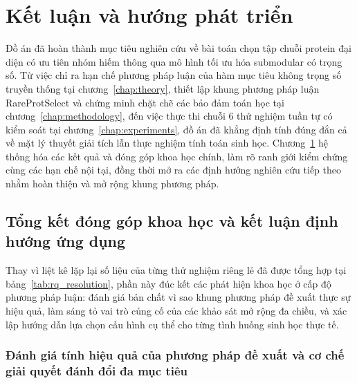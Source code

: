 \chapter{Kết luận và hướng phát triển}
\label{chap:conclusion}

Đồ án đã hoàn thành mục tiêu nghiên cứu về bài toán chọn tập chuỗi protein đại diện có ưu tiên nhóm hiếm thông qua mô hình tối ưu hóa submodular có trọng số. Từ việc chỉ ra hạn chế phương pháp luận của hàm mục tiêu không trọng số truyền thống tại chương~\ref{chap:theory}, thiết lập khung phương pháp luận RareProtSelect và chứng minh chặt chẽ các bảo đảm toán học tại chương~\ref{chap:methodology}, đến việc thực thi chuỗi 6 thử nghiệm tuần tự có kiểm soát tại chương~\ref{chap:experiments}, đồ án đã khẳng định tính đúng đắn cả về mặt lý thuyết giải tích lẫn thực nghiệm tính toán sinh học. Chương~\ref{chap:conclusion} hệ thống hóa các kết quả và đóng góp khoa học chính, làm rõ ranh giới kiểm chứng cùng các hạn chế nội tại, đồng thời mở ra các định hướng nghiên cứu tiếp theo nhằm hoàn thiện và mở rộng khung phương pháp.

\section{Tổng kết đóng góp khoa học và kết luận định hướng ứng dụng}
\label{sec:conc_contributions}

Thay vì liệt kê lặp lại số liệu của từng thử nghiệm riêng lẻ đã được tổng hợp tại bảng~\ref{tab:rq_resolution}, phần này đúc kết các phát hiện khoa học ở cấp độ phương pháp luận: đánh giá bản chất vì sao khung phương pháp đề xuất thực sự hiệu quả, làm sáng tỏ vai trò củng cố của các khảo sát mở rộng đa chiều, và xác lập hướng dẫn lựa chọn cấu hình cụ thể cho từng tình huống sinh học thực tế.

\subsection{Đánh giá tính hiệu quả của phương pháp đề xuất và cơ chế giải quyết đánh đổi đa mục tiêu}
\label{subsec:conc_core_effectiveness}
\label{subsec:conc_five_tasks}
\label{subsec:conc_core_methodology}

